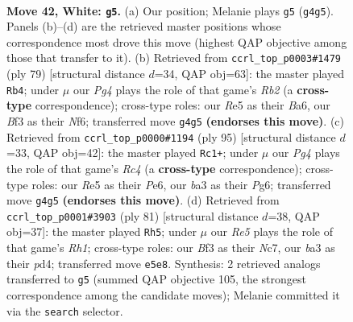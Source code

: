 \documentclass[11pt]{article}
\begin{document}
\clearpage

\begin{figure}[p]\centering
\begin{subfigure}{0.46\textwidth}\centering
\resizebox{\linewidth}{!}{%
\newchessgame
\chessboard[
  setfen={8/pp4kp/6p1/4R3/5PPP/b1q2BK1/8/8 w - - 7 42},
  showmover=false,
  pgfstyle=straightmove, color=movearrow, markmove={g4-g5}
]}
\caption{}
\end{subfigure}\hfill
\begin{subfigure}{0.46\textwidth}\centering
\resizebox{\linewidth}{!}{%
\newchessgame
\chessboard[
  setfen={8/1r3pk1/b2p1npp/8/4P3/7P/6PK/QB6 b - - 4 40},
  showmover=false,
  pgfstyle=straightmove, color=movearrow, markmove={b7-b4}
]}
\caption{}
\end{subfigure}
\\[4pt]
\begin{subfigure}{0.46\textwidth}\centering
\resizebox{\linewidth}{!}{%
\newchessgame
\chessboard[
  setfen={Q4bk1/5p1p/4p1pP/p1r5/P7/6P1/5P2/5K2 b - - 14 48},
  showmover=false,
  pgfstyle=straightmove, color=movearrow, markmove={c5-c1}
]}
\caption{}
\end{subfigure}\hfill
\begin{subfigure}{0.46\textwidth}\centering
\resizebox{\linewidth}{!}{%
\newchessgame
\chessboard[
  setfen={7r/pkn3Q1/1p6/3p1p2/3P3p/4P3/PP1K4/8 b - - 5 41},
  showmover=false,
  pgfstyle=straightmove, color=movearrow, markmove={h8-h5}
]}
\caption{}
\end{subfigure}
\caption{\textbf{Move 42, White: \texttt{g5}.} (a) Our position; Melanie plays \texttt{g5} (\texttt{g4g5}). Panels (b)--(d) are the retrieved master positions whose correspondence most drove this move (highest QAP objective among those that transfer to it). (b) Retrieved from \texttt{ccrl\_top\_p0003\#1479} (ply 79) [structural distance $d$=34, QAP obj=63]: the master played \texttt{Rb4}; under $\mu$ our \emph{Pg4} plays the role of that game's \emph{Rb2} (a \textbf{cross-type} correspondence); cross-type roles: our \emph{R}e5 as their \emph{B}a6, our \emph{B}f3 as their \emph{N}f6; transferred move \texttt{g4g5} \textbf{(endorses this move)}. (c) Retrieved from \texttt{ccrl\_top\_p0000\#1194} (ply 95) [structural distance $d$=33, QAP obj=42]: the master played \texttt{Rc1+}; under $\mu$ our \emph{Pg4} plays the role of that game's \emph{Rc4} (a \textbf{cross-type} correspondence); cross-type roles: our \emph{R}e5 as their \emph{P}e6, our \emph{b}a3 as their \emph{P}g6; transferred move \texttt{g4g5} \textbf{(endorses this move)}. (d) Retrieved from \texttt{ccrl\_top\_p0001\#3903} (ply 81) [structural distance $d$=38, QAP obj=37]: the master played \texttt{Rh5}; under $\mu$ our \emph{Re5} plays the role of that game's \emph{Rh1}; cross-type roles: our \emph{B}f3 as their \emph{N}c7, our \emph{b}a3 as their \emph{p}d4; transferred move \texttt{e5e8}. Synthesis: 2 retrieved analogs transferred to \texttt{g5} (summed QAP objective 105, the strongest correspondence among the candidate moves); Melanie committed it via the \texttt{search} selector.}
\label{fig:thought-m82}
\end{figure}
\end{document}
